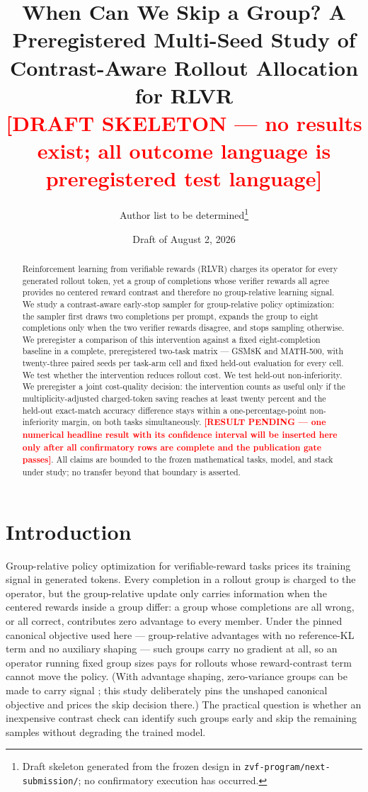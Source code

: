 \documentclass[11pt]{article}
\title{When Can We Skip a Group? A Preregistered Multi-Seed Study of Contrast-Aware Rollout Allocation for RLVR\\[1ex]
{\large\textcolor{red}{[DRAFT SKELETON --- no results exist; all outcome language is preregistered test language]}}}
\author{Author list to be determined\thanks{Draft skeleton generated from the frozen design in \texttt{zvf-program/next-submission/}; no confirmatory execution has occurred.}}
\date{Draft of August 2, 2026}
\newcommand{\resultpending}[1]{\textcolor{red}{\textbf{[RESULT PENDING --- #1]}}}
\begin{document}
\maketitle

\begin{abstract}
Reinforcement learning from verifiable rewards (RLVR) charges its operator for every generated rollout token, yet a group of completions whose verifier rewards all agree provides no centered reward contrast and therefore no group-relative learning signal. We study a contrast-aware early-stop sampler for group-relative policy optimization: the sampler first draws two completions per prompt, expands the group to eight completions only when the two verifier rewards disagree, and stops sampling otherwise. We preregister a comparison of this intervention against a fixed eight-completion baseline in a complete, preregistered two-task matrix --- GSM8K and MATH-500, with twenty-three paired seeds per task-arm cell and fixed held-out evaluation for every cell. We test whether the intervention reduces rollout cost. We test held-out non-inferiority. We preregister a joint cost-quality decision: the intervention counts as useful only if the multiplicity-adjusted charged-token saving reaches at least twenty percent and the held-out exact-match accuracy difference stays within a one-percentage-point non-inferiority margin, on both tasks simultaneously. \resultpending{one numerical headline result with its confidence interval will be inserted here only after all confirmatory rows are complete and the publication gate passes}. All claims are bounded to the frozen mathematical tasks, model, and stack under study; no transfer beyond that boundary is asserted.
\end{abstract}

\section{Introduction}
\label{sec:introduction}

Group-relative policy optimization for verifiable-reward tasks prices its training signal in generated tokens. Every completion in a rollout group is charged to the operator, but the group-relative update only carries information when the centered rewards inside a group differ: a group whose completions are all wrong, or all correct, contributes zero advantage to every member. Under the pinned canonical objective used here --- group-relative advantages with no reference-KL term and no auxiliary shaping --- such groups carry no gradient at all, so an operator running fixed group sizes pays for rollouts whose reward-contrast term cannot move the policy. (With advantage shaping, zero-variance groups can be made to carry signal \citep{le2025rlzvp}; this study deliberately pins the unshaped canonical objective and prices the skip decision there.) The practical question is whether an inexpensive contrast check can identify such groups early and skip the remaining samples without degrading the trained model.
\end{document}
